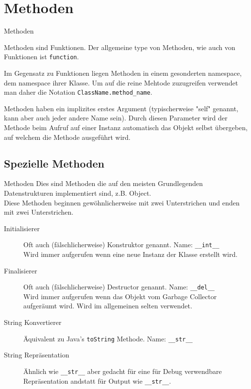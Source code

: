\section{Methoden}
\begin{frame}[fragile]{Methoden}

Methoden sind Funktionen. Der allgemeine type von Methoden, wie auch von Funktionen ist \texttt{function}.

Im Gegensatz zu Funktionen liegen Methoden in einem gesonderten namespace, dem namespace ihrer Klasse. Um auf die reine Mehtode zuzugreifen verwendet man daher die Notation \texttt{ClassName.method\_name}.

Methoden haben ein implizites erstes Argument (typischerweise "self" genannt, kann aber auch jeder andere Name sein). Durch diesen Parameter wird der Methode beim Aufruf auf einer Instanz automatisch das Objekt selbst übergeben, auf welchem die Methode ausgeführt wird.

\end{frame}


\subsection{Spezielle Methoden}
\begin{frame}[fragile]{Methoden}
	Dies sind Methoden die auf den meisten Grundlegenden Datenstrukturen implementiert sind, z.B. Object.\\
	Diese Methoden beginnen gewöhnlicherweise mit zwei Unterstrichen und enden mit zwei Unterstrichen.

	\begin{description}
		\item[Initialisierer] Oft auch (fälschlicherweise) Konstruktor genannt. Name: \texttt{\_\_int\_\_}\\
			Wird immer aufgerufen wenn eine neue Instanz der Klasse erstellt wird.
		\item[Finalisierer] Oft auch (fälschlicherweise) Destructor genannt. Name: \texttt{\_\_del\_\_}\\
			Wird immer aufgerufen wenn das Objekt vom Garbage Collector aufgeräumt wird. Wird im allgemeinen selten verwendet.
		\item[String Konvertierer] Äquivalent zu Java's \texttt{toString} Methode. Name: \texttt{\_\_str\_\_}
		\item[String Repräsentation] Ähnlich wie \texttt{\_\_str\_\_} aber gedacht für eine für Debug verwendbare Repräsentation andstatt für Output wie \texttt{\_\_str\_\_}.
	\end{description}
\end{frame}

